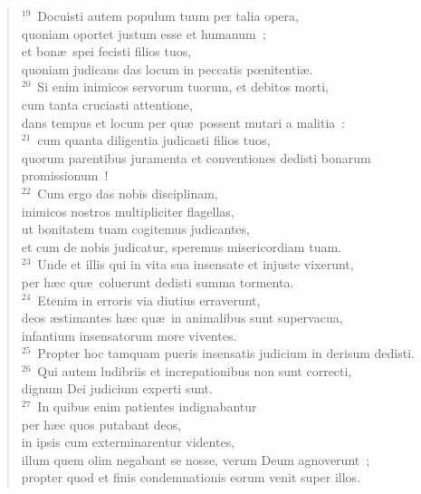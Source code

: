 \begin{verse}${}^{19}$~Docuisti autem populum tuum per talia opera,\\ quoniam oportet justum esse et humanum~;\\ et bon\ae\ spei fecisti filios tuos,\\ quoniam judicans das locum in peccatis pœnitenti\ae .\\
${}^{20}$~Si enim inimicos servorum tuorum, et debitos morti,\\ cum tanta cruciasti attentione,\\ dans tempus et locum per qu\ae\ possent mutari a malitia~:\\
${}^{21}$~cum quanta diligentia judicasti filios tuos,\\ quorum parentibus juramenta et conventiones dedisti bonarum promissionum~!\\
${}^{22}$~Cum ergo das nobis disciplinam,\\ inimicos nostros multipliciter flagellas,\\ ut bonitatem tuam cogitemus judicantes,\\ et cum de nobis judicatur, speremus misericordiam tuam.\\
${}^{23}$~Unde et illis qui in vita sua insensate et injuste vixerunt,\\ per h\ae c qu\ae\ coluerunt dedisti summa tormenta.\\
${}^{24}$~Etenim in erroris via diutius erraverunt,\\ deos \ae stimantes h\ae c qu\ae\ in animalibus sunt supervacua,\\ infantium insensatorum more viventes.\\
${}^{25}$~Propter hoc tamquam pueris insensatis judicium in derisum dedisti.\\
${}^{26}$~Qui autem ludibriis et increpationibus non sunt correcti,\\ dignum Dei judicium experti sunt.\\
${}^{27}$~In quibus enim patientes indignabantur\\ per h\ae c quos putabant deos,\\ in ipsis cum exterminarentur videntes,\\ illum quem olim negabant se nosse, verum Deum agnoverunt~;\\ propter quod et finis condemnationis eorum venit super illos.\end{verse}


